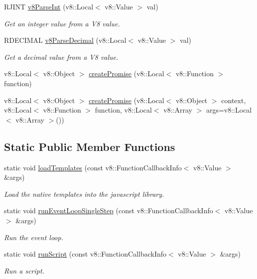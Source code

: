 \begin{DoxyCompactItemize}
R\+J\+I\+NT \mbox{\hyperlink{class_rad_j_a_v_1_1_v8_javascript_engine_a84c962d7d592cb90fb2b5650c1c4ebac}{v8\+Parse\+Int}} (v8\+::\+Local$<$ v8\+::\+Value $>$ val)
\begin{DoxyCompactList}\small\item\em Get an integer value from a V8 value. \end{DoxyCompactList}\item 
R\+D\+E\+C\+I\+M\+AL \mbox{\hyperlink{class_rad_j_a_v_1_1_v8_javascript_engine_a4be2d9f0eb007b9bff3b8cde3dca41ec}{v8\+Parse\+Decimal}} (v8\+::\+Local$<$ v8\+::\+Value $>$ val)
\begin{DoxyCompactList}\small\item\em Get a decimal value from a V8 value. \end{DoxyCompactList}\item 
v8\+::\+Local$<$ v8\+::\+Object $>$ \mbox{\hyperlink{class_rad_j_a_v_1_1_v8_javascript_engine_ae50f236f667aa73f1cc5b36fc79bfeda}{create\+Promise}} (v8\+::\+Local$<$ v8\+::\+Function $>$ function)
\item 
v8\+::\+Local$<$ v8\+::\+Object $>$ \mbox{\hyperlink{class_rad_j_a_v_1_1_v8_javascript_engine_aeba84f96b6350917eed87a9fc46bff9d}{create\+Promise}} (v8\+::\+Local$<$ v8\+::\+Object $>$ context, v8\+::\+Local$<$ v8\+::\+Function $>$ function, v8\+::\+Local$<$ v8\+::\+Array $>$ args=v8\+::\+Local$<$ v8\+::\+Array $>$())
\end{DoxyCompactItemize}
\subsection*{Static Public Member Functions}
\begin{DoxyCompactItemize}
\item 
static void \mbox{\hyperlink{class_rad_j_a_v_1_1_v8_javascript_engine_aacc9572ce9cc0e4c9977fa588adfe5f6}{load\+Templates}} (const v8\+::\+Function\+Callback\+Info$<$ v8\+::\+Value $>$ \&args)
\begin{DoxyCompactList}\small\item\em Load the native templates into the javascript library. \end{DoxyCompactList}\item 
static void \mbox{\hyperlink{class_rad_j_a_v_1_1_v8_javascript_engine_a724d0548650a735ceac32239f8442a20}{run\+Event\+Loop\+Single\+Step}} (const v8\+::\+Function\+Callback\+Info$<$ v8\+::\+Value $>$ \&args)
\begin{DoxyCompactList}\small\item\em Run the event loop. \end{DoxyCompactList}\item 
static void \mbox{\hyperlink{class_rad_j_a_v_1_1_v8_javascript_engine_a4564a04928c0dd79e002ed74b9dc6b5e}{run\+Script}} (const v8\+::\+Function\+Callback\+Info$<$ v8\+::\+Value $>$ \&args)
\begin{DoxyCompactList}\small\item\em Run a script. \end{DoxyCompactList}\end{DoxyCompactItemize}
